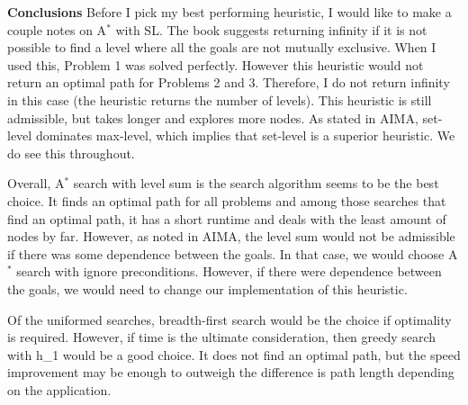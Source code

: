\documentclass{article}
\begin{document}
{\Large \textbf{Conclusions}}
\vskip1pt
Before I pick my best performing heuristic, I would like to make a couple notes on A$^*$ with SL. The book suggests returning infinity if it is not possible to find a level where all the goals are not mutually exclusive. When I used this, Problem 1 was solved perfectly. However this heuristic would not return an optimal path for Problems 2 and 3. Therefore, I do not return infinity in this case (the heuristic returns the number of levels). This heuristic is still admissible, but takes longer and explores more nodes. As stated in AIMA, set-level dominates max-level, which implies that set-level is a superior heuristic. We do see this throughout.

Overall, A$^*$ search with level sum is the search algorithm seems to be the best choice. It finds an optimal path for all problems and among those searches that find an optimal path, it has a short runtime and deals with the least amount of nodes by far. However, as noted in AIMA, the level sum would not be admissible if there was some dependence between the goals. In that case, we would choose A$^*$ search with ignore preconditions. However, if there were dependence between the goals, we would need to change our implementation of this heuristic.

Of the uniformed searches, breadth-first search would be the choice if optimality is required. However, if time is the ultimate consideration, then greedy search with h\_1 would be a good choice. It does not find an optimal path, but the speed improvement may be enough to outweigh the difference is path length depending on the application.
\end{document}
